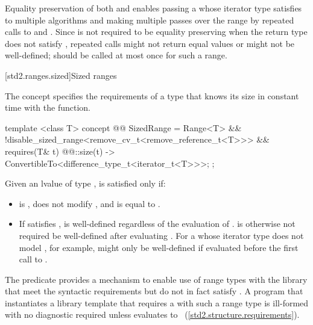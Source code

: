 \pnum \enternote
Equality preservation of both  and  enables passing a 
whose iterator type satisfies 
to multiple algorithms and
making multiple passes over the range by repeated calls to  and .
Since  is not required to be equality preserving when the return type does
not satisfy , repeated calls might not return equal values or
might not be well-defined;  should be called at most once for such a range.
\exitnote

[std2.ranges.sized]{Sized ranges}

\pnum
The  concept specifies the requirements
of a  type that knows its size in constant time with the
 function.

\begin{itemdecl}
template <class T>
concept @@ SizedRange =
  Range<T> &&
  !disable_sized_range<remove_cv_t<remove_reference_t<T>>> &&
  requires(T& t) {
    { @@::size(t) } -> ConvertibleTo<difference_type_t<iterator_t<T>>>;
  };
\end{itemdecl}

\begin{itemdescr}
\pnum
Given an lvalue  of type ,  is satisfied only if:

\begin{itemize}
\item {} is , does not modify , and is equal
to .

\item If  satisfies ,
 is well-defined regardless of the evaluation of
. \enternote {} is otherwise not required be
well-defined after evaluating . For a 
whose iterator type does not model , for
example,  might only be well-defined if evaluated before
the first call to . \exitnote
\end{itemize}

\pnum
\enternote The  predicate provides a mechanism to enable use
of range types with the library that meet the syntactic requirements but do
not in fact satisfy . A program that instantiates a library template
that requires a  with such a range type  is ill-formed with no
diagnostic required unless
 evaluates
to ~(\ref{std2.structure.requirements}). \exitnote
\end{itemdescr}

